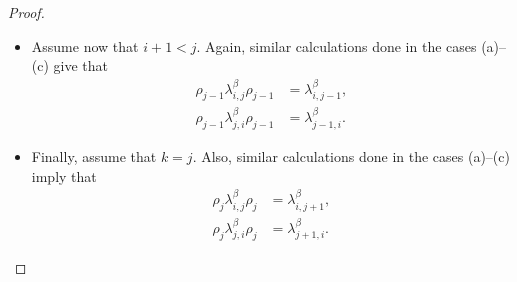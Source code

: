 \documentclass[preprint]{elsarticle}
\begin{document}
\begin{proof}
\begin{itemize}
\begin{align*}
    \rho_i \lambda_{i,i+1}^{\beta} \rho_i &= \lambda_{i+1,i}^{\beta},\\
    \rho_i \lambda_{i,j}^{\beta} \rho_i &= \lambda_{i+1,j}^{\beta},\\
\rho_i \lambda_{i+1,i}^{\beta} \rho_i &= \lambda_{i,i+1}^{\beta},\\
\rho_i \lambda_{j,i}^{\beta} \rho_i &= \lambda_{j,i+1}^{\beta}.
\end{align*}
\item[(e)] Assume now that $i+1<j$. Again, similar calculations done in the cases (a)--(c) give that
\begin{align*}
    \rho_{j-1} \lambda_{i,j}^{\beta} \rho_{j-1} &= \lambda_{i,j-1}^{\beta},\\
    \rho_{j-1} \lambda_{j,i}^{\beta} \rho_{j-1} &= \lambda_{j-1,i}^{\beta}.
\end{align*}
\item[(f)] Finally, assume that $k=j$. Also, similar calculations done in the cases (a)--(c) imply that
\begin{align*}
    \rho_{j} \lambda_{i,j}^{\beta} \rho_{j} &= \lambda_{i,j+1}^{\beta},\\
    \rho_{j} \lambda_{j,i}^{\beta} \rho_{j} &= \lambda_{j+1,i}^{\beta}.
\end{align*}
        \end{itemize}
\end{proof}
\end{document}
